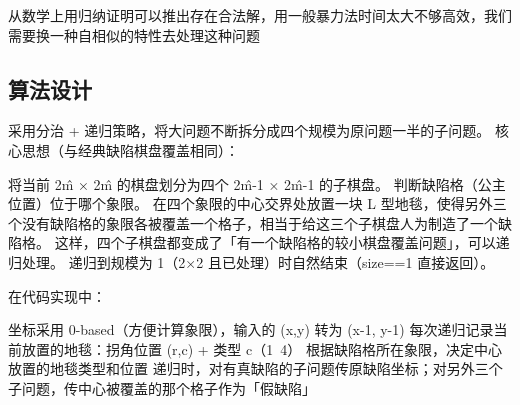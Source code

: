 \documentclass[supercite]{Experimental_Report}
\theoremstyle{definition}
\begin{document}
	从数学上用归纳证明可以推出存在合法解，用一般暴力法时间太大不够高效，我们需要换一种自相似的特性去处理这种问题
	\subsection{算法设计}
	采用分治 + 递归策略，将大问题不断拆分成四个规模为原问题一半的子问题。
	核心思想（与经典缺陷棋盘覆盖相同）：
	
	将当前 2\^m × 2\^m 的棋盘划分为四个 2\^{m-1} × 2\^{m-1} 的子棋盘。
	判断缺陷格（公主位置）位于哪个象限。
	在四个象限的中心交界处放置一块 L 型地毯，使得另外三个没有缺陷格的象限各被覆盖一个格子，相当于给这三个子棋盘人为制造了一个缺陷格。
	这样，四个子棋盘都变成了「有一个缺陷格的较小棋盘覆盖问题」，可以递归处理。
	递归到规模为 1（2×2 且已处理）时自然结束（size==1 直接返回）。
	
	在代码实现中：
	
	坐标采用 0-based（方便计算象限），输入的 (x,y) 转为 (x-1, y-1)
	每次递归记录当前放置的地毯：拐角位置 (r,c) + 类型 c（1~4）
	根据缺陷格所在象限，决定中心放置的地毯类型和位置
	递归时，对有真缺陷的子问题传原缺陷坐标；对另外三个子问题，传中心被覆盖的那个格子作为「假缺陷」
	
\end{document}
